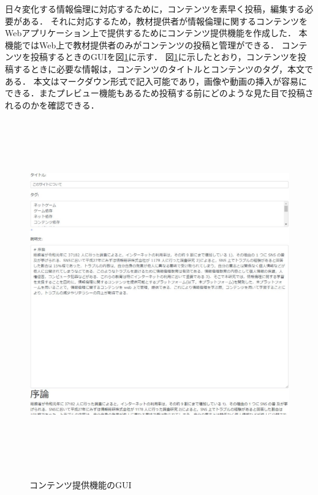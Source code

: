 日々変化する情報倫理に対応するために，コンテンツを素早く投稿，編集する必要がある．
それに対応するため，教材提供者が情報倫理に関するコンテンツをWebアプリケーション上で提供するためにコンテンツ提供機能を作成した．
本機能ではWeb上で教材提供者のみがコンテンツの投稿と管理ができる．
コンテンツを投稿するときのGUIを図\ref{content_teikyou}に示す．
図\ref{content_teikyou}に示したとおり，コンテンツを投稿するときに必要な情報は，コンテンツのタイトルとコンテンツのタグ，本文である．
本文はマークダウン形式で記入可能であり，画像や動画の挿入が容易にできる．またプレビュー機能もあるため投稿する前にどのような見た目で投稿されるのかを確認できる．

\begin{figure}[htbp]
    \begin{center}
        \includegraphics[width=16cm,height=15cm,keepaspectratio]{content_teikyou-crop.pdf}\\
    \end{center}
    \caption{コンテンツ提供機能のGUI}
    \label{content_teikyou}
\end{figure}

